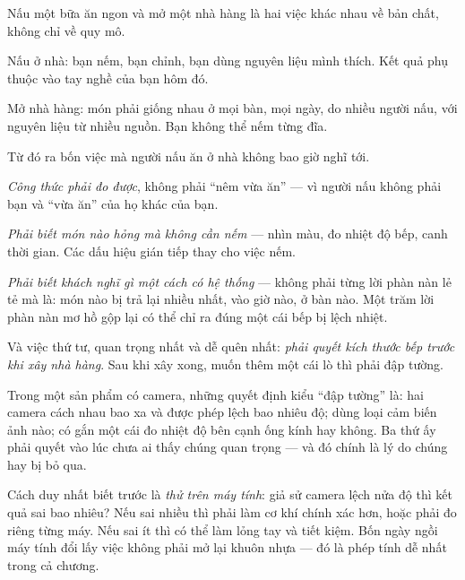 \documentclass[../../vslam.tex]{subfiles}
\begin{document}
\begin{traloi}
\end{traloi}

\begin{dongian}
Nấu một bữa ăn ngon và mở một nhà hàng là hai việc khác nhau về bản chất, không chỉ về quy mô.

Nấu ở nhà: bạn nếm, bạn chỉnh, bạn dùng nguyên liệu mình thích. Kết quả phụ thuộc vào tay nghề của bạn hôm đó.

Mở nhà hàng: món phải giống nhau ở mọi bàn, mọi ngày, do nhiều người nấu, với nguyên liệu từ nhiều nguồn. Bạn không thể nếm từng đĩa.

Từ đó ra bốn việc mà người nấu ăn ở nhà không bao giờ nghĩ tới.

\emph{Công thức phải đo được}, không phải ``nêm vừa ăn'' --- vì người nấu không phải bạn và ``vừa ăn'' của họ khác của bạn.

\emph{Phải biết món nào hỏng mà không cần nếm} --- nhìn màu, đo nhiệt độ bếp, canh thời gian. Các dấu hiệu gián tiếp thay cho việc nếm.

\emph{Phải biết khách nghĩ gì một cách có hệ thống} --- không phải từng lời phàn nàn lẻ tẻ mà là: món nào bị trả lại nhiều nhất, vào giờ nào, ở bàn nào. Một trăm lời phàn nàn mơ hồ gộp lại có thể chỉ ra đúng một cái bếp bị lệch nhiệt.

Và việc thứ tư, quan trọng nhất và dễ quên nhất: \emph{phải quyết kích thước bếp trước khi xây nhà hàng}. Sau khi xây xong, muốn thêm một cái lò thì phải đập tường.

Trong một sản phẩm có camera, những quyết định kiểu ``đập tường'' là: hai camera cách nhau bao xa và được phép lệch bao nhiêu độ; dùng loại cảm biến ảnh nào; có gắn một cái đo nhiệt độ bên cạnh ống kính hay không. Ba thứ ấy phải quyết vào lúc chưa ai thấy chúng quan trọng --- và đó chính là lý do chúng hay bị bỏ qua.

Cách duy nhất biết trước là \emph{thử trên máy tính}: giả sử camera lệch nửa độ thì kết quả sai bao nhiêu? Nếu sai nhiều thì phải làm cơ khí chính xác hơn, hoặc phải đo riêng từng máy. Nếu sai ít thì có thể làm lỏng tay và tiết kiệm. Bốn ngày ngồi máy tính đổi lấy việc không phải mở lại khuôn nhựa --- đó là phép tính dễ nhất trong cả chương.

\end{dongian}
\end{document}

